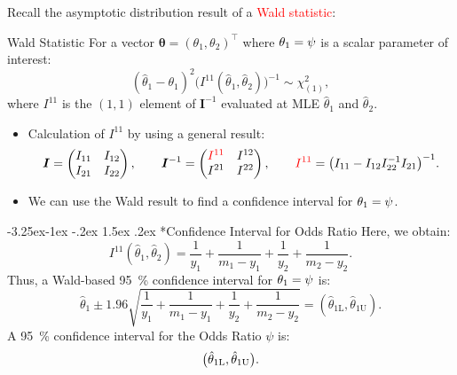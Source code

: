 \documentclass[final]{article}\usepackage[]{graphicx}\usepackage[svgnames]{xcolor}
\makeatletter
\renewcommand\subsection{\@startsection{subsection}{2}{\z@}%
                                     {-3.25ex\@plus -1ex \@minus -.2ex}%
                                     {1.5ex \@plus .2ex}%
                                     {\normalfont\large\bfseries\scshape\color{Blue}}}
\let\exp\relax%
\let\log\relax%
\providecommand{\Vector}[1]{\bm{#1}}%
\providecommand{\Matrix}[1]{\bm{#1}}
\makeatother
\begin{document}
Recall the asymptotic distribution result of a \textcolor{Red}{Wald statistic}:
\begin{Regular}{Wald Statistic}
    For a vector $ \Vector{\theta}=(\theta_1,\theta_2)^\top $ where $ \theta_1=\log{\psi} $ is a scalar parameter of interest:
    \[ (\hat{\theta}_1-\theta_1)^2\bigl(I^{11}(\hat{\theta}_1,\hat{\theta}_2)\bigr)^{-1}\sim \chi^2_{(1)}, \]
    where $ I^{11} $ is the $ (1,1) $ element of $ \Matrix{I}^{-1} $ evaluated at MLE $ \hat{\theta}_1 $ and $ \hat{\theta}_2 $.
\end{Regular}
\begin{itemize}
    \item Calculation of $ I^{11} $ by using a general result:
          \[ \Matrix{I}=\begin{pmatrix}
                  I_{11} & I_{12} \\
                  I_{21} & I_{22}
              \end{pmatrix},\qquad \Matrix{I}^{-1}=\begin{pmatrix}
                  \textcolor{Red}{I^{11}} & I^{12} \\
                  I^{21}                  & I^{22}
              \end{pmatrix},\qquad \textcolor{Red}{I^{11}}=\bigl(I_{11}-I_{12}I_{22}^{-1}I_{21}\bigr)^{-1}. \]
    \item We can use the Wald result to find a confidence interval for $ \theta_1=\log{\psi} $.
\end{itemize}
\subsection*{Confidence Interval for Odds Ratio}
Here, we obtain:
\[ I^{11}(\hat{\theta}_1,\hat{\theta}_2)=\frac{1}{y_1} +\frac{1}{m_1-y_1}+\frac{1}{y_2}+\frac{1}{m_2-y_2}. \]
Thus, a Wald-based \qty{95}{\percent} confidence interval for $ \theta_1=\log{\psi} $ is:
\[ \hat{\theta}_1\pm 1.96\sqrt{\frac{1}{y_1} +\frac{1}{m_1-y_1} +\frac{1}{y_2} +\frac{1}{m_2-y_2}}=(\hat{\theta}_{1\text{L}},\hat{\theta}_{1\text{U}}). \]
A \qty{95}{\percent} confidence interval for the Odds Ratio $ \psi $ is:
\[ \bigl(\exp{\hat{\theta}_{1\text{L}}},\exp{\hat{\theta}_{1\text{U}}}\bigr). \]
\end{document}
